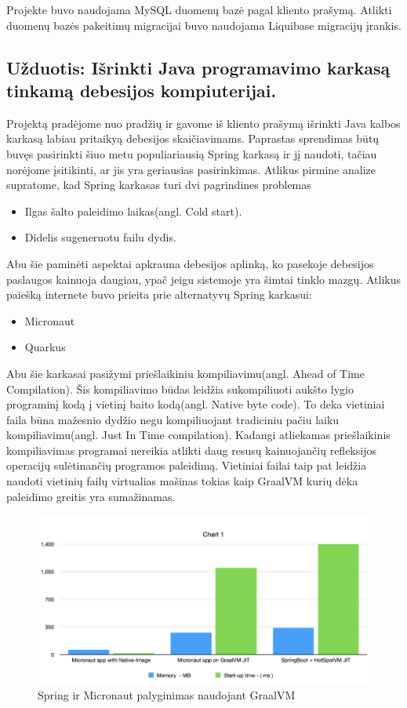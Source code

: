 \documentclass{VUMIFPSkursinis}
\begin{document}
		Projekte buvo naudojama MySQL duomenų bazė pagal kliento prašymą.
		Atlikti duomenų bazės pakeitimų migracijai buvo naudojama Liquibase migracijų įrankis.

	\subsection{Užduotis: Išrinkti Java programavimo karkasą tinkamą debesijos kompiuterijai.}
		Projektą pradėjome nuo pradžių ir gavome iš kliento prašymą išrinkti Java kalbos karkasą labiau pritaikyą debesijos skaičiavimams.
		Paprastas sprendimas būtų buvęs pasirinkti šiuo metu populiariausią Spring karkasą ir jį naudoti, tačiau norėjome įsitikinti, ar jis yra geriausias pasirinkimas.
		Atlikus pirmine analize supratome, kad Spring karkasas turi dvi pagrindines problemas
		\begin{itemize}
			\item{Ilgas šalto paleidimo laikas(angl. Cold start).}
			\item{Didelis sugeneruotu failu dydis.}
		\end{itemize}
		Abu šie paminėti aspektai apkrauna debesijos aplinką, ko pasekoje debesijos paslaugos kainuoja daugiau, ypač jeigu sistemoje yra šimtai tinklo mazgų.
		Atlikus paiešką internete buvo prieita prie alternatyvų Spring karkasui:
		\begin{itemize}
			\item{Micronaut}
			\item{Quarkus}
		\end{itemize}
		Abu šie karkasai pasižymi priešlaikiniu kompiliavimu(angl. Ahead of Time Compilation).
		Šis kompiliavimo būdas leidžia sukompiliuoti aukšto lygio programinį kodą į vietinį baito kodą(angl. Native byte code).
		To deka vietiniai faila būna mažesnio dydžio negu kompiliuojant tradiciniu pačiu laiku kompiliavimu(angl. Just In Time compilation).
		Kadangi atliekamas priešlaikinis kompiliavimas programai nereikia atlikti daug resusų kainuojančių refleksijos operacijų sulėtinančių programos paleidimą.
		Vietiniai failai taip pat leidžia naudoti vietinių failų virtualias mašinas tokias kaip GraalVM kurių dėka paleidimo greitis yra sumažinamas.
			\begin{figure}[H]
			\includegraphics[scale=0.7]{img/three}
			\caption{Spring ir Micronaut palyginimas naudojant GraalVM} %
			\label{img:kurimoProcesas}
			\end{figure}
\end{document}
